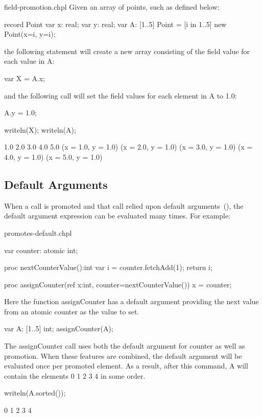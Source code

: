 \begin{chapelexample}{field-promotion.chpl}
Given an array of points, such as  defined below:
\begin{chapel}
record Point {
  var x: real;
  var y: real;
}
var A: [1..5] Point = [i in 1..5] new Point(x=i, y=i);
\end{chapel}
the following statement will create a new array consisting of
the  field value for each value in A:
\begin{chapel}
var X = A.x;
\end{chapel}
and the following call will set the  field values for each
element in A to 1.0:
\begin{chapel}
A.y = 1.0;
\end{chapel}

\begin{chapelnoprint}
writeln(X);
writeln(A);
\end{chapelnoprint}
\begin{chapeloutput}
1.0 2.0 3.0 4.0 5.0
(x = 1.0, y = 1.0) (x = 2.0, y = 1.0) (x = 3.0, y = 1.0) (x = 4.0, y = 1.0) (x = 5.0, y = 1.0)
\end{chapeloutput}
\end{chapelexample}


\subsection{Default Arguments}
\label{Promotion_Default_Arguments}

When a call is promoted and that call relied upon default
arguments~(), the default argument expression can
be evaluated many times. For example:

\begin{chapelexample}{promotes-default.chpl}
\begin{chapel}
  var counter: atomic int;

  proc nextCounterValue():int {
    var i = counter.fetchAdd(1);
    return i;
  }

  proc assignCounter(ref x:int, counter=nextCounterValue()) {
    x = counter;
  }
\end{chapel}

Here the function assignCounter has a default argument
providing the next value from an atomic counter as the value to set.

\begin{chapel}
  var A: [1..5] int;
  assignCounter(A);
\end{chapel}

The assignCounter call uses both the default argument for counter as well
as promotion. When these features are combined, the default argument
will be evaluated once per promoted element. As a result, after this
command, A will contain the elements 0 1 2 3 4 in some order.

\begin{chapelnoprint}
writeln(A.sorted());
\end{chapelnoprint}
\begin{chapeloutput}
0 1 2 3 4
\end{chapeloutput}
\end{chapelexample}


